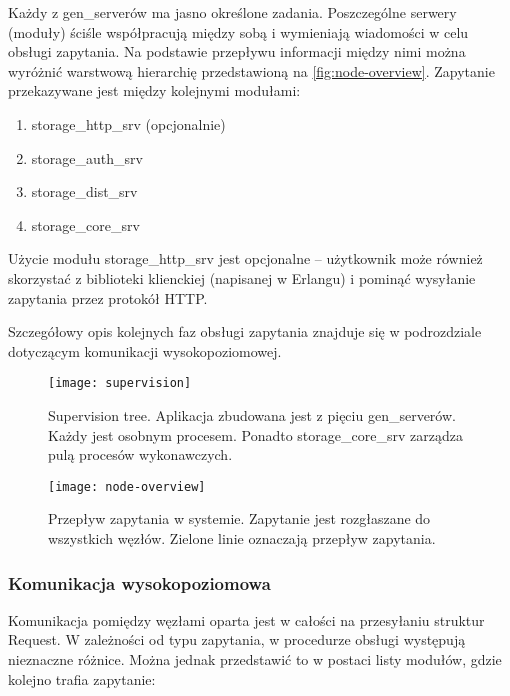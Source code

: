 Każdy z gen\_serverów ma jasno określone zadania. Poszczególne serwery (moduły) ściśle współpracują między sobą i wymieniają wiadomości w celu obsługi zapytania. Na podstawie przepływu informacji między nimi można wyróżnić warstwową hierarchię przedstawioną na \autoref{fig:node-overview}. Zapytanie przekazywane jest między kolejnymi modułami:
\begin{enumerate}
	\item storage\_http\_srv (opcjonalnie)
	\item storage\_auth\_srv
	\item storage\_dist\_srv
	\item storage\_core\_srv
\end{enumerate}

Użycie modułu storage\_http\_srv jest opcjonalne – użytkownik może również skorzystać z biblioteki klienckiej (napisanej w Erlangu) i pominąć wysyłanie zapytania przez protokół HTTP.

Szczegółowy opis kolejnych faz obsługi zapytania znajduje się w podrozdziale dotyczącym komunikacji wysokopoziomowej.

\begin{figure}[!htbp]
	\centering
	\texttt{[image: supervision]}
	\caption[Supervision tree.]{Supervision tree. Aplikacja zbudowana jest z pięciu gen\_serverów. Każdy jest osobnym procesem. Ponadto storage\_core\_srv zarządza pulą procesów wykonawczych.}
	\label{fig:supervision}
\end{figure}

\begin{figure}[!htbp]
	\centering
	\texttt{[image: node-overview]}
	\caption[Przepływ zapytania w systemie.]{Przepływ zapytania w systemie. Zapytanie jest rozgłaszane do wszystkich węzłów. Zielone linie oznaczają przepływ zapytania.}
	\label{fig:node-overview}
\end{figure}

\subsubsection{Komunikacja wysokopoziomowa}
Komunikacja pomiędzy węzłami oparta jest w całości na przesyłaniu struktur Request. W zależności od typu zapytania, w procedurze obsługi występują nieznaczne różnice. Można jednak przedstawić to w postaci listy modułów, gdzie kolejno trafia zapytanie:

